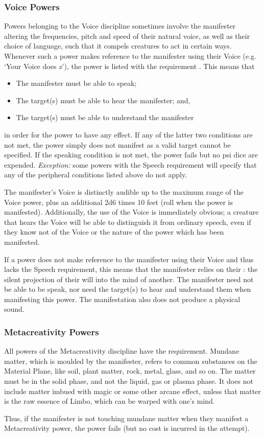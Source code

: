 \subsubsection{Voice Powers}
\label{subs:voice_powers}
Powers belonging to the Voice discipline sometimes involve
the manifester altering the frequencies, pitch and
speed of their natural voice, as well as their choice
of language, such that it compels
creatures to act in certain ways.
Whenever such a power makes reference to the manifester
using their Voice (e.g. `Your Voice does \textit{x}'),
the power is listed with the requirement .
This means that
\begin{itemize}
    \item The manifester must be able to speak;
    \item The target(s) must be able to hear the manifester; and,
    \item The target(s) must be able to understand the manifester
\end{itemize}
in order for the power to have any effect.
If any of the latter two conditions are not met,
the power simply does not manifest as a valid target
cannot be specified.
If the speaking condition is not met,
the power fails but no psi dice are expended.
\textit{Exception:} some powers with the Speech requirement
will specify that any of the peripheral conditions listed above
do not apply.

The manifester's Voice is distinctly audible
up to the maximum range of the Voice power,
plus an additional 2d6 times 10 feet
(roll when the power is manifested).
Additionally, the use of the Voice is immediately obvious;
a creature that hears the Voice will be able to distinguish
it from ordinary speech,
even if they know not of the Voice or
the nature of the power which has been manifested.

If a power does not make reference to the manifester
using their Voice and thus lacks the Speech requirement,
this means that the manifester relies on their
: the silent projection of their will
into the mind of another.
The manifester need not be able to be speak,
nor need the target(s) to hear and understand them
when manifesting this power.
The manifestation also does not produce a physical sound.

\subsubsection{Metacreativity Powers}
All powers of the Metacreativity discipline have the
 requirement.
Mundane matter, which is moulded by the manifester,
refers to common substances on the
Material Plane,
like soil, plant matter, rock, metal,
glass, and so on.
The matter must be in the solid phase,
and not the liquid, gas or plasma phase.
It does not include matter imbued with magic
or some other arcane effect,
unless that matter is the raw essence of Limbo,
which can be warped with one's mind.

Thus,
if the manifester is not touching mundane matter
when they manifest a Metacreativity power,
the power fails (but no cost is incurred in the attempt).